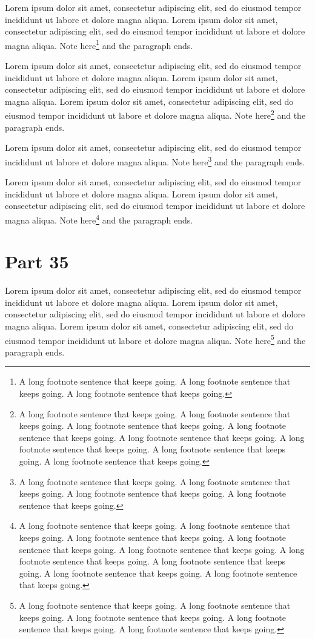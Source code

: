 \documentclass{article}
\begin{document}
Lorem ipsum dolor sit amet, consectetur adipiscing elit, sed do eiusmod tempor incididunt ut labore et dolore magna aliqua. Lorem ipsum dolor sit amet, consectetur adipiscing elit, sed do eiusmod tempor incididunt ut labore et dolore magna aliqua. Note here\footnote{A long footnote sentence that keeps going. A long footnote sentence that keeps going. A long footnote sentence that keeps going. } and the paragraph ends.

Lorem ipsum dolor sit amet, consectetur adipiscing elit, sed do eiusmod tempor incididunt ut labore et dolore magna aliqua. Lorem ipsum dolor sit amet, consectetur adipiscing elit, sed do eiusmod tempor incididunt ut labore et dolore magna aliqua. Lorem ipsum dolor sit amet, consectetur adipiscing elit, sed do eiusmod tempor incididunt ut labore et dolore magna aliqua. Note here\footnote{A long footnote sentence that keeps going. A long footnote sentence that keeps going. A long footnote sentence that keeps going. A long footnote sentence that keeps going. A long footnote sentence that keeps going. A long footnote sentence that keeps going. A long footnote sentence that keeps going. A long footnote sentence that keeps going. } and the paragraph ends.

Lorem ipsum dolor sit amet, consectetur adipiscing elit, sed do eiusmod tempor incididunt ut labore et dolore magna aliqua. Note here\footnote{A long footnote sentence that keeps going. A long footnote sentence that keeps going. A long footnote sentence that keeps going. A long footnote sentence that keeps going. } and the paragraph ends.

Lorem ipsum dolor sit amet, consectetur adipiscing elit, sed do eiusmod tempor incididunt ut labore et dolore magna aliqua. Lorem ipsum dolor sit amet, consectetur adipiscing elit, sed do eiusmod tempor incididunt ut labore et dolore magna aliqua. Note here\footnote{A long footnote sentence that keeps going. A long footnote sentence that keeps going. A long footnote sentence that keeps going. A long footnote sentence that keeps going. A long footnote sentence that keeps going. A long footnote sentence that keeps going. A long footnote sentence that keeps going. A long footnote sentence that keeps going. A long footnote sentence that keeps going. } and the paragraph ends.

\section{Part 35}
Lorem ipsum dolor sit amet, consectetur adipiscing elit, sed do eiusmod tempor incididunt ut labore et dolore magna aliqua. Lorem ipsum dolor sit amet, consectetur adipiscing elit, sed do eiusmod tempor incididunt ut labore et dolore magna aliqua. Lorem ipsum dolor sit amet, consectetur adipiscing elit, sed do eiusmod tempor incididunt ut labore et dolore magna aliqua. Note here\footnote{A long footnote sentence that keeps going. A long footnote sentence that keeps going. A long footnote sentence that keeps going. A long footnote sentence that keeps going. A long footnote sentence that keeps going. } and the paragraph ends.
\end{document}

